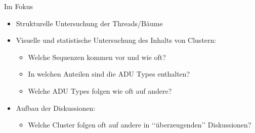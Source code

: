 \documentclass[compress,12pt]{beamer}
\begin{document}
    \begin{frame}{Im Fokus}
        \begin{itemize}
            \item Strukturelle Untersuchung der Threads/Bäume
            \item Visuelle und statistische Untersuchung des Inhalts von Clustern:
            \begin{itemize}
                \item Welche Sequenzen kommen vor und wie oft?
                \item In welchen Anteilen sind die ADU Types enthalten?
                \item Welche ADU Types folgen wie oft auf andere?
            \end{itemize}
            \item Aufbau der Diskussionen:
            \begin{itemize}
                \item Welche Cluster folgen oft auf andere in \lq\lq{}überzeugenden\rq\rq{} Diskussionen?
            \end{itemize}
        \end{itemize}
    \end{frame}

\end{document}

